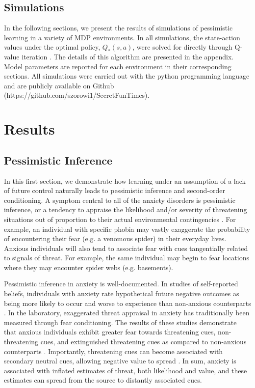 \documentclass[11pt]{article} %
\begin{document}
\subsection{Simulations}

In the following sections, we present the results of simulations of pessimistic learning in a variety of MDP environments. In all simulations, the state-action values under the optimal policy, $Q_*(s,a)$, were solved for directly through Q-value iteration \citep{SuttonBarto1998, SuttonBarto1998, bertsekas2005}. The details of this algorithm are presented in the appendix. Model parameters are reported for each environment in their corresponding sections. All simulations were carried out with the python programming language and are publicly available on Github (https://github.com/szorowi1/SecretFunTimes).

\section{Results}

\subsection{Pessimistic Inference}

In this first section, we demonstrate how learning under an assumption of a lack of future control naturally leads to pessimistic inference and second-order conditioning. A symptom central to all of the anxiety disorders is pessimistic inference, or a tendency to appraise the likelihood and/or severity of threatening situations out of proportion to their actual environmental contingencies \citep{dsm5, BeckClark1997, ClarkBeck2011}. For example, an individual with specific phobia may vastly exaggerate the probability of encountering their fear (e.g. a venomous spider) in their everyday lives. Anxious individuals will also tend to associate fear with cues tangentially related to signals of threat. For example, the same individual may begin to fear locations where they may encounter spider webs (e.g. basements).

Pessimistic inference in anxiety is well-documented. In studies of self-reported beliefs, individuals with anxiety rate hypothetical future negative outcomes as being more likely to occur and worse to experience than non-anxious counterparts \citep{ButlerMathews1983, ButlerMathews1987, Foa1996, MacLeod1996, MacLeod1997, Luten1997, Stober1997, Borkovec1999, Maner2006, Mitte2007, Miranda2007}. In the laboratory, exaggerated threat appraisal in anxiety has traditionally been measured through fear conditioning. The results of these studies demonstrate that anxious individuals exhibit greater fear towards threatening cues, non-threatening cues, and extinguished threatening cues as compared to non-anxious counterparts \citep{lissek2005, MinekaOehlberg2008, Duits2015}. Importantly, threatening cues can become associated with secondary neutral cues, allowing negative value to spread \citep{wessa2007}. In sum, anxiety is associated with inflated estimates of threat, both likelihood and value, and these estimates can spread from the source to distantly associated cues.
\end{document}
